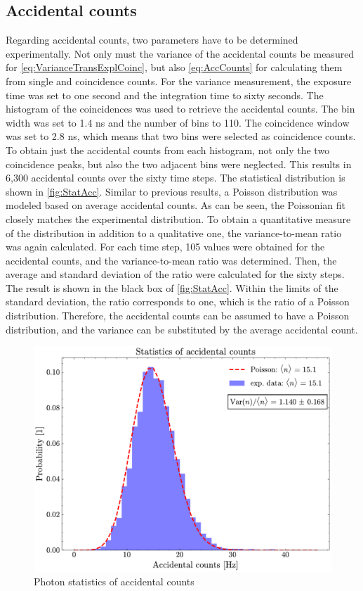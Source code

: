 \subsection{Accidental counts}
Regarding accidental counts, two parameters have to be determined experimentally.
Not only must the variance of the accidental counts be measured for \autoref{eq:VarianceTransExplCoinc}, but also \autoref{eq:AccCounts} for calculating them from single and coincidence counts. \newline
For the variance measurement, the exposure time was set to one second and the integration time to sixty seconds.
The histogram of the coincidences was used to retrieve the accidental counts. The bin width was set to 1.4 ns and the number of bins to 110. The coincidence window was set to 2.8 ns, which means that two bins were selected as coincidence counts. To obtain just the accidental counts from each histogram, not only the two coincidence peaks, but also the two adjacent bins were neglected. This results in 6,300 accidental counts over the sixty time steps.  \newline
The statistical distribution is shown in \autoref{fig:StatAcc}. Similar to previous results, a Poisson distribution was modeled based on average accidental counts. As can be seen, the Poissonian fit closely matches the experimental distribution. \newline
To obtain a quantitative measure of the distribution in addition to a qualitative one, the variance-to-mean ratio was again calculated. For each time step, 105 values were obtained for the accidental counts, and the variance-to-mean ratio was determined. Then, the average and standard deviation of the ratio were calculated for the sixty steps. The result is shown in the black box of \autoref{fig:StatAcc}. \newline
Within the limits of the standard deviation, the ratio corresponds to one, which is the ratio of a Poisson distribution. Therefore, the accidental counts can be assumed to have a Poisson distribution, and the variance can be substituted by the average accidental count.
\begin{figure}[tb!]
	\centering
	\includegraphics[width=.7\textwidth]{Images/AccCountsStatistics.pdf}
	\caption{Photon statistics of accidental counts}
	\label{fig:StatAcc}
\end{figure} \newline
